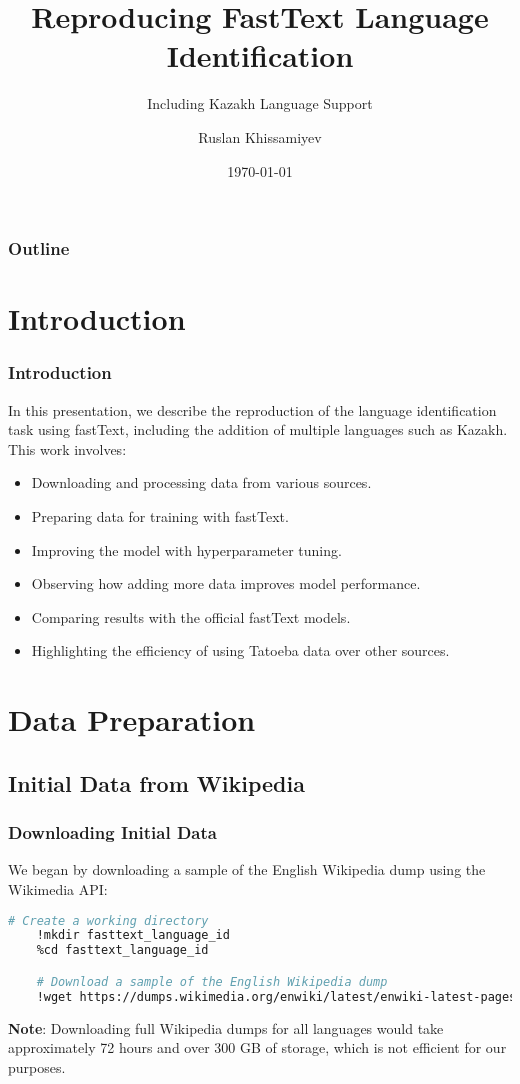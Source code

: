 \documentclass{beamer}
\title{Reproducing FastText Language Identification}
\subtitle{Including Kazakh Language Support}
\author{Ruslan Khissamiyev}
\institute{Macquarie University}
\date{\today}
\begin{document}
\begin{frame}
    \titlepage
\end{frame}

\begin{frame}
    \frametitle{Outline}
    \tableofcontents
\end{frame}

\section{Introduction}
\begin{frame}
    \frametitle{Introduction}
    In this presentation, we describe the reproduction of the language identification task using fastText, including the addition of multiple languages such as Kazakh. This work involves:

    \begin{itemize}
        \item Downloading and processing data from various sources.
        \item Preparing data for training with fastText.
        \item Improving the model with hyperparameter tuning.
        \item Observing how adding more data improves model performance.
        \item Comparing results with the official fastText models.
        \item Highlighting the efficiency of using Tatoeba data over other sources.
    \end{itemize}
\end{frame}

\section{Data Preparation}

\subsection{Initial Data from Wikipedia}
\begin{frame}[fragile]
    \frametitle{Downloading Initial Data}
    We began by downloading a sample of the English Wikipedia dump using the Wikimedia API:

    \begin{lstlisting}[language=bash]
    # Create a working directory
    !mkdir fasttext_language_id
    %cd fasttext_language_id

    # Download a sample of the English Wikipedia dump
    !wget https://dumps.wikimedia.org/enwiki/latest/enwiki-latest-pages-articles1.xml-p1p41242.bz2 -O enwiki_sample.xml.bz2
    \end{lstlisting}

    \textbf{Note}: Downloading full Wikipedia dumps for all languages would take approximately 72 hours and over 300 GB of storage, which is not efficient for our purposes.
\end{frame}
\end{document}
